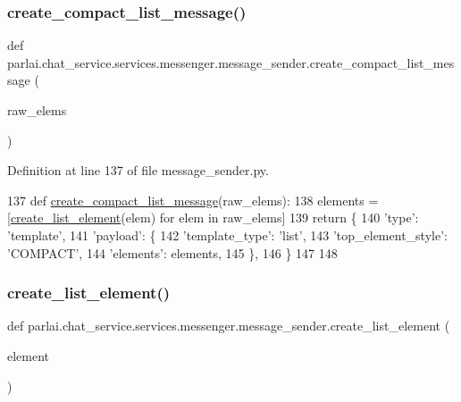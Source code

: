 \subsubsection{\texorpdfstring{create\+\_\+compact\+\_\+list\+\_\+message()}{create\_compact\_list\_message()}}
{\footnotesize\ttfamily def parlai.\+chat\+\_\+service.\+services.\+messenger.\+message\+\_\+sender.\+create\+\_\+compact\+\_\+list\+\_\+message (\begin{DoxyParamCaption}\item[{}]{raw\+\_\+elems }\end{DoxyParamCaption})}



Definition at line 137 of file message\+\_\+sender.\+py.


\begin{DoxyCode}
137 \textcolor{keyword}{def }\hyperlink{namespaceparlai_1_1chat__service_1_1services_1_1messenger_1_1message__sender_aad605cb9ba870a032f7b09775bebabb1}{create\_compact\_list\_message}(raw\_elems):
138     elements = [\hyperlink{namespaceparlai_1_1chat__service_1_1services_1_1messenger_1_1message__sender_a25b4cf40191d466edc7f8da108326f8c}{create\_list\_element}(elem) \textcolor{keywordflow}{for} elem \textcolor{keywordflow}{in} raw\_elems]
139     \textcolor{keywordflow}{return} \{
140         \textcolor{stringliteral}{'type'}: \textcolor{stringliteral}{'template'},
141         \textcolor{stringliteral}{'payload'}: \{
142             \textcolor{stringliteral}{'template\_type'}: \textcolor{stringliteral}{'list'},
143             \textcolor{stringliteral}{'top\_element\_style'}: \textcolor{stringliteral}{'COMPACT'},
144             \textcolor{stringliteral}{'elements'}: elements,
145         \},
146     \}
147 
148 
\end{DoxyCode}
\mbox{\label{namespaceparlai_1_1chat__service_1_1services_1_1messenger_1_1message__sender_a25b4cf40191d466edc7f8da108326f8c}} 
\subsubsection{\texorpdfstring{create\+\_\+list\+\_\+element()}{create\_list\_element()}}
{\footnotesize\ttfamily def parlai.\+chat\+\_\+service.\+services.\+messenger.\+message\+\_\+sender.\+create\+\_\+list\+\_\+element (\begin{DoxyParamCaption}\item[{}]{element }\end{DoxyParamCaption})}



